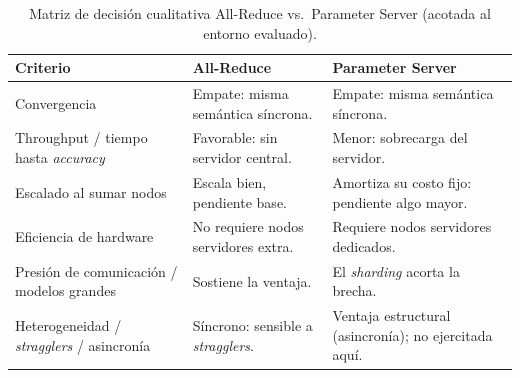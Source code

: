 \begin{table}[H]\centering
\caption{Matriz de decisi\'on cualitativa All-Reduce vs.\ Parameter Server (acotada al entorno evaluado).}\label{tab:decision}
\footnotesize
\begin{tabular}{@{}p{}p{}p{}@{}}\toprule
Criterio & All-Reduce & Parameter Server\\\midrule
Convergencia & Empate: misma sem\'antica s\'incrona. & Empate: misma sem\'antica s\'incrona.\\
Throughput / tiempo hasta \emph{accuracy} & Favorable: sin servidor central. & Menor: sobrecarga del servidor.\\
Escalado al sumar nodos & Escala bien, pendiente base. & Amortiza su costo fijo: pendiente algo mayor.\\
Eficiencia de hardware & No requiere nodos servidores extra. & Requiere nodos servidores dedicados.\\
Presi\'on de comunicaci\'on / modelos grandes & Sostiene la ventaja. & El \emph{sharding} acorta la brecha.\\
Heterogeneidad / \emph{stragglers} / asincron\'ia & S\'incrono: sensible a \emph{stragglers}. & Ventaja estructural (asincron\'ia); no ejercitada aqu\'i.\\
\bottomrule\end{tabular}
\end{table}
